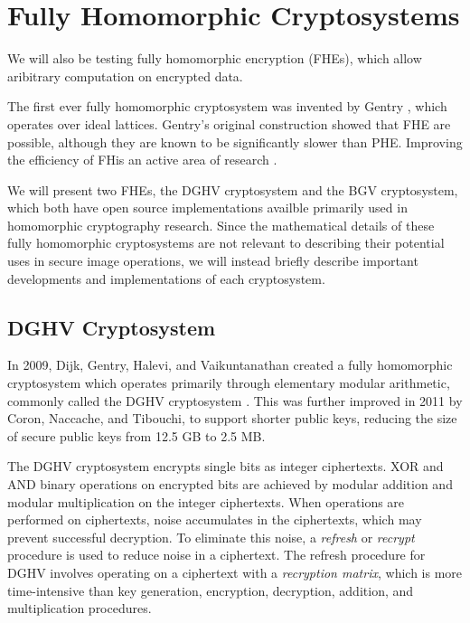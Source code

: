 \section{Fully Homomorphic Cryptosystems}

We will also be testing fully homomorphic encryption (FHEs), which allow aribitrary computation on encrypted data.

The first ever fully homomorphic cryptosystem was invented by Gentry \cite{gentry_fully_2009}, which operates over ideal lattices. Gentry's original construction showed that FHE are possible, although they are known to be significantly slower than PHE. 
Improving the efficiency of FHis an active area of research \cite{sen_homomorphic_2013}. 

We will present two FHEs, the DGHV cryptosystem and the BGV cryptosystem, which both have open source implementations availble primarily used in homomorphic cryptography research. Since the mathematical details of these fully homomorphic cryptosystems are not relevant to describing their potential uses in secure image operations, we will instead briefly describe important developments and implementations of each cryptosystem.

\subsection{DGHV Cryptosystem}
In 2009, Dijk, Gentry, Halevi, and Vaikuntanathan created a fully homomorphic cryptosystem which operates primarily through elementary modular arithmetic, commonly called the DGHV cryptosystem \cite{cryptoeprint:2009:616}. This was further improved in 2011 by Coron, Naccache, and Tibouchi, \cite{cryptoeprint:2011:277, cryptoeprint:2011:440} to support shorter public keys, reducing the size of secure public keys from 12.5 GB to 2.5 MB. 

The DGHV cryptosystem encrypts single bits as integer ciphertexts. XOR and AND binary operations on encrypted bits are achieved by modular addition and modular multiplication on the integer ciphertexts. When operations are performed on ciphertexts, noise accumulates in the ciphertexts, which may prevent successful decryption. To eliminate this noise, a \textit{refresh} or \textit{recrypt} procedure is used to reduce noise in a ciphertext. The refresh procedure for DGHV involves operating on a ciphertext with a \textit{recryption matrix}, which is more time-intensive than key generation, encryption, decryption, addition, and multiplication procedures.

